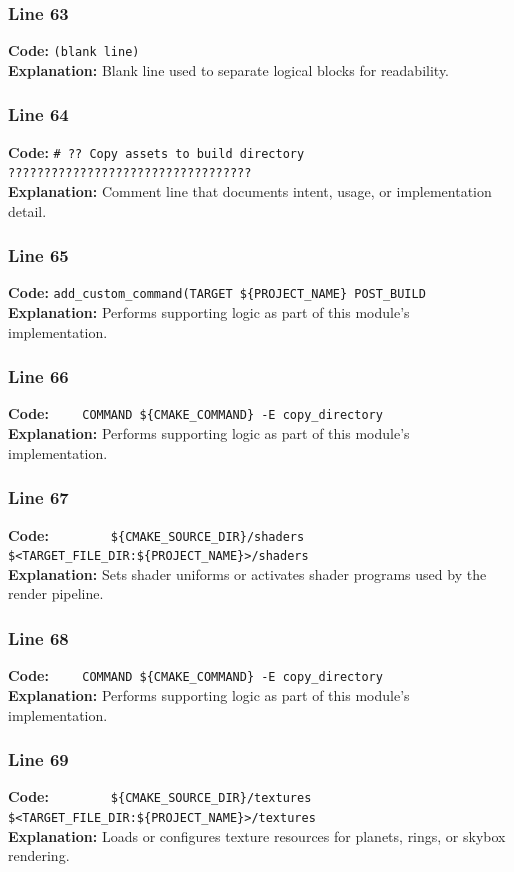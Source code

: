 \documentclass[11pt,a4paper]{article}
\begin{document}
\subsubsection*{Line 63}
\textbf{Code:} \texttt{(blank line)}\\
\textbf{Explanation:} Blank line used to separate logical blocks for readability.

\subsubsection*{Line 64}
\textbf{Code:} \verb|# ?? Copy assets to build directory ??????????????????????????????????|\\
\textbf{Explanation:} Comment line that documents intent, usage, or implementation detail.

\subsubsection*{Line 65}
\textbf{Code:} \verb|add_custom_command(TARGET ${PROJECT_NAME} POST_BUILD|\\
\textbf{Explanation:} Performs supporting logic as part of this module's implementation.

\subsubsection*{Line 66}
\textbf{Code:} \verb|    COMMAND ${CMAKE_COMMAND} -E copy_directory|\\
\textbf{Explanation:} Performs supporting logic as part of this module's implementation.

\subsubsection*{Line 67}
\textbf{Code:} \verb|        ${CMAKE_SOURCE_DIR}/shaders $<TARGET_FILE_DIR:${PROJECT_NAME}>/shaders|\\
\textbf{Explanation:} Sets shader uniforms or activates shader programs used by the render pipeline.

\subsubsection*{Line 68}
\textbf{Code:} \verb|    COMMAND ${CMAKE_COMMAND} -E copy_directory|\\
\textbf{Explanation:} Performs supporting logic as part of this module's implementation.

\subsubsection*{Line 69}
\textbf{Code:} \verb|        ${CMAKE_SOURCE_DIR}/textures $<TARGET_FILE_DIR:${PROJECT_NAME}>/textures|\\
\textbf{Explanation:} Loads or configures texture resources for planets, rings, or skybox rendering.
\end{document}
